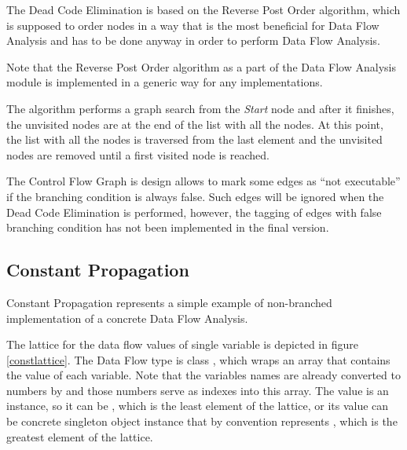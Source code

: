         The Dead Code Elimination is based on the Reverse Post Order 
        algorithm, which is supposed to order nodes in a way that 
        is the most beneficial for Data Flow Analysis and has to be 
        done anyway in order to perform Data Flow Analysis.
        
        Note that the Reverse Post Order algorithm as a part 
        of the Data Flow Analysis module is implemented 
        in a generic way for any  implementations. 
        
        The algorithm performs a graph search from the \emph{Start} 
        node and after it finishes, the unvisited nodes are 
        at the end of the list with all the nodes. At this point, 
        the list with all the nodes is traversed from the last 
        element and the unvisited nodes are removed until a 
        first visited node is reached.
        
        The Control Flow Graph is design allows to mark 
        some edges as ``not executable'' if the branching 
        condition is always false. Such edges will be ignored 
        when the Dead Code Elimination is performed, however, 
        the tagging of edges with false branching condition 
        has not been implemented in the final version.        
        
        \subsection{Constant Propagation}
        Constant Propagation represents a simple example of non-branched 
        implementation of a concrete Data Flow Analysis. 
        
        The lattice for the data flow values of single variable is 
        depicted in figure \ref{constlattice}. The Data Flow type is class 
        , which wraps an array 
        that contains the value of each variable. Note 
        that the variables names are already converted to numbers by 
         and those numbers serve as indexes into this array.
        The value is an  instance, so it can be , which 
        is the least element of the lattice, or its value can be concrete 
        singleton object instance that by convention represents 
        , which is the greatest element of the lattice.
        
